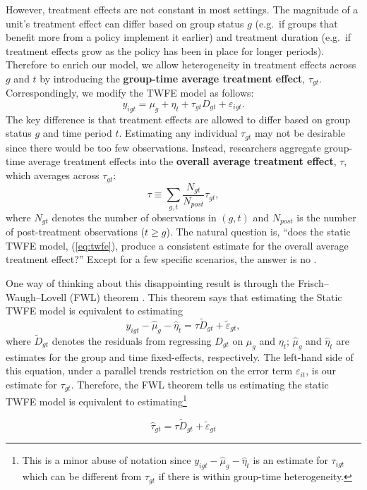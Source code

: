 However, treatment effects are not constant in most settings. The
magnitude of a unit's treatment effect can differ based on group status
\(g\) (e.g.~if groups that benefit more from a policy implement it
earlier) and treatment duration (e.g.~if treatment effects grow as the
policy has been in place for longer periods). Therefore to enrich our
model, we allow heterogeneity in treatment effects across \(g\) and
\(t\) by introducing the \textbf{group-time average treatment effect},
\(\tau_{gt}\). Correspondingly, we modify the TWFE model as follows: \[
  y_{igt} = \mu_g + \eta_t + \tau_{gt} D_{gt} + \varepsilon_{igt}.
\] The key difference is that treatment effects are allowed to differ
based on group status \(g\) and time period \(t\). Estimating any
individual \(\tau_{gt}\) may not be desirable since there would be too
few observations. Instead, researchers aggregate group-time average
treatment effects into the \textbf{overall average treatment effect},
\(\tau\), which averages across \(\tau_{gt}\): \[
  \tau \equiv \sum_{g, t} \frac{N_{gt}}{N_{post}} \tau_{gt},
\] where \(N_{gt}\) denotes the number of observations in \((g, t)\) and
\(N_{post}\) is the number of post-treatment observations
(\(t \geq g\)). The natural question is, ``does the static TWFE model,
(\ref{eq:twfe}), produce a consistent estimate for the overall average
treatment effect?'' Except for a few specific scenarios, the answer is
no
\citep{Sun_Abraham_2020, Goodman-Bacon_2018, Borusyak_Jaravel_Spiess_2021, deChaisemartin_DHaultfoeuille_2019}.

One way of thinking about this disappointing result is through the
Frisch--Waugh--Lovell (FWL) theorem \citep{Frisch_Waugh_1933}. This
theorem says that estimating the Static TWFE model is equivalent to
estimating \[
y_{igt} - \hat{\mu}_g - \hat{\eta}_t = \tau \tilde{D}_{gt} + \tilde{\varepsilon}_{gt},
\] where \(\tilde{D}_{gt}\) denotes the residuals from regressing
\(D_{gt}\) on \(\mu_g\) and \(\eta_t\); \(\hat{\mu}_g\) and
\(\hat{\eta}_t\) are estimates for the group and time fixed-effects,
respectively. The left-hand side of this equation, under a parallel
trends restriction on the error term \(\varepsilon_{it}\), is our
estimate for \(\tau_{gt}\). Therefore, the FWL theorem tells us
estimating the static TWFE model is equivalent to estimating\footnote{This
  is a minor abuse of notation since
  \(y_{igt} - \hat{\mu}_g - \hat{\eta}_t\) is an estimate for
  \(\tau_{igt}\) which can be different from \(\tau_{gt}\) if there is
  within group-time heterogeneity.}

\[
\hat{\tau}_{gt} = \tau \tilde{D}_{gt} + \tilde{\varepsilon}_{gt}
\]

